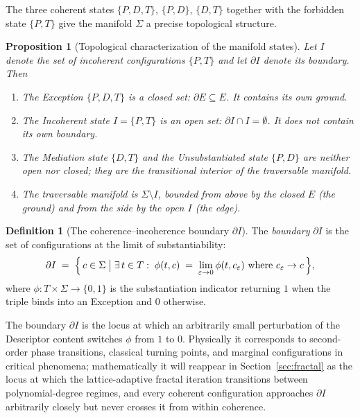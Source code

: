 \documentclass[11pt,a4paper]{article}
\newtheorem{proposition}[theorem]{Proposition}
\theoremstyle{definition}
\newtheorem{definition}[theorem]{Definition}
\theoremstyle{remark}
\newcommand{\eps}{\varepsilon}
\begin{document}
The three coherent states $\{P,D,T\}$, $\{P,D\}$, $\{D,T\}$ together with the forbidden state $\{P,T\}$ give the manifold $\Sigma$ a precise topological structure.

\begin{proposition}[Topological characterization of the manifold states]\label{prop:topology}
Let $I$ denote the set of incoherent configurations $\{P,T\}$ and let $\partial I$ denote its boundary. Then
\begin{enumerate}[label=(\roman*),leftmargin=*]
\item The Exception $\{P,D,T\}$ is a closed set: $\partial E \subseteq E$. It contains its own ground.
\item The Incoherent state $I = \{P,T\}$ is an open set: $\partial I \cap I = \emptyset$. It does not contain its own boundary.
\item The Mediation state $\{D,T\}$ and the Unsubstantiated state $\{P,D\}$ are neither open nor closed; they are the transitional interior of the traversable manifold.
\item The traversable manifold is $\Sigma \setminus I$, bounded from above by the closed $E$ (the ground) and from the side by the open $I$ (the edge).
\end{enumerate}
\end{proposition}

\begin{definition}[The coherence--incoherence boundary $\partial I$]\label{def:dI}
The \emph{boundary} $\partial I$ is the set of configurations at the limit of substantiability:
\[
\partial I \;=\; \Bigl\{\, c \in \Sigma \;\big|\; \exists\, t\in T :\; \phi(t,c) \;=\; \lim_{\eps\to 0}\phi(t, c_{\eps})\text{ where }c_{\eps}\to c \,\Bigr\},
\]
where $\phi : T \times \Sigma \to \{0,1\}$ is the substantiation indicator returning $1$ when the triple binds into an Exception and $0$ otherwise.
\end{definition}

The boundary $\partial I$ is the locus at which an arbitrarily small perturbation of the Descriptor content switches $\phi$ from $1$ to $0$. Physically it corresponds to second-order phase transitions, classical turning points, and marginal configurations in critical phenomena; mathematically it will reappear in Section~\ref{sec:fractal} as the locus at which the lattice-adaptive fractal iteration transitions between polynomial-degree regimes, and every coherent configuration approaches $\partial I$ arbitrarily closely but never crosses it from within coherence.
\end{document}
